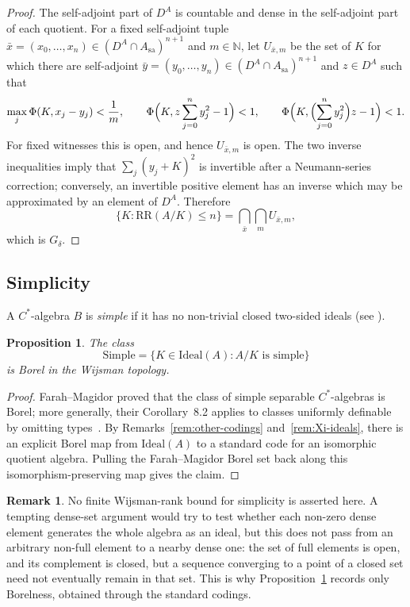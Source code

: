 \documentclass[12pt,fleqn,a4paper]{amsart}
\renewcommand{\le}{\leqslant}
\numberwithin{equation}{section}
\newtheorem{proposition}[theorem]{Proposition}
\theoremstyle{definition}
\newtheorem{remark}[theorem]{Remark}
\newcommand{\N}{\mathbb{N}}
\newcommand{\Ideal}{\mathrm{Ideal}}
\begin{document}
\begin{proof}
The self-adjoint part of $D^A$ is countable and dense in the self-adjoint part of each
quotient.  For a fixed self-adjoint tuple
$\bar x=(x_0,\ldots,x_n)\in(D^A\cap A_{\mathrm{sa}})^{n+1}$ and $m\in\N$, let
$U_{\bar x,m}$ be the set of $K$ for which there are self-adjoint
$\bar y=(y_0,\ldots,y_n)\in(D^A\cap A_{\mathrm{sa}})^{n+1}$ and $z\in D^A$ such that
\[
\max_j\Phi(K,x_j-y_j)<\frac1m,
\qquad
\Phi\Bigl(K,z\sum_{j=0}^n y_j^2-1\Bigr)<1,
\qquad
\Phi\Bigl(K,\Bigl(\sum_{j=0}^n y_j^2\Bigr)z-1\Bigr)<1 .
\]
For fixed witnesses this is open, and hence $U_{\bar x,m}$ is open.  The two inverse
inequalities imply that $\sum_j(y_j+K)^2$ is invertible after a Neumann-series
correction; conversely, an invertible positive element has an inverse which may be
approximated by an element of $D^A$.  Therefore
\[
        \{K:\mathrm{RR}(A/K)\le n\}
        =\bigcap_{\bar x}\bigcap_m U_{\bar x,m},
\]
which is $G_\delta$.
\end{proof}

\subsection{Simplicity}

A $C^*$-algebra $B$ is \emph{simple} if it has no non-trivial closed two-sided ideals
(see \cite[II.1.1]{BlackadarOA}).

\begin{proposition}\label{prop:simple}
The class
\[
\mathrm{Simple}=\{K\in\Ideal(A):A/K\text{ is simple}\}
\]
is Borel in the Wijsman topology.
\end{proposition}

\begin{proof}
Farah--Magidor proved that the class of simple separable $C^*$-algebras is Borel;
more generally, their Corollary~8.2 applies to classes uniformly definable by omitting
types~\cite[Corollary~8.2]{FarahMagidor2018}.  By
Remarks~\ref{rem:other-codings} and~\ref{rem:Xi-ideals}, there is an explicit Borel
map from $\Ideal(A)$ to a standard code for an isomorphic quotient algebra.  Pulling
the Farah--Magidor Borel set back along this isomorphism-preserving map gives the
claim.
\end{proof}



\begin{remark}
No finite Wijsman-rank bound for simplicity is asserted here.  A tempting dense-set
argument would try to test whether each non-zero dense element generates the whole
algebra as an ideal, but this does not pass from an arbitrary non-full element to a
nearby dense one: the set of full elements is open, and its complement is closed, but a
sequence converging to a point of a closed set need not eventually remain in that set.
This is why Proposition~\ref{prop:simple} records only Borelness, obtained through the
standard codings.
\end{remark}
\end{document}
